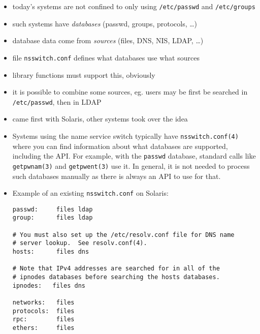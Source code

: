 \begin{slide}
\begin{itemize}
\item today's systems are not confined to only using
\texttt{/etc/passwd} and \texttt{/etc/groups}
\item such systems have \emph{databases} (passwd, groups, protocols, \dots)
\item database data come from \emph{sources} (files, DNS, NIS, LDAP, \dots)
\item file \texttt{nsswitch.conf} defines what databases use what sources
\item library functions must support this, obviously
\item it is possible to combine some sources, eg. users may be first be searched
in \texttt{/etc/passwd}, then in LDAP
\item came first with Solaris, other systems took over the idea
\end{itemize}
\end{slide}

\label{name_service_switch}

\begin{itemize}
\item Systems using the name service switch typically have
\texttt{nsswitch.conf(4)} where you can find information about what databases
are supported, including the API.  For example, with the \texttt{passwd}
database, standard calls like \texttt{getpwnam(3)} and \texttt{getpwent(3)} use
it.  In general, it is not needed to process such databases manually as there is
always an API to use for that.
\item Example of an existing \texttt{nsswitch.conf} on Solaris:

\begin{verbatim}
passwd:     files ldap
group:      files ldap

# You must also set up the /etc/resolv.conf file for DNS name
# server lookup.  See resolv.conf(4).
hosts:      files dns

# Note that IPv4 addresses are searched for in all of the
# ipnodes databases before searching the hosts databases.
ipnodes:   files dns

networks:   files
protocols:  files
rpc:        files
ethers:     files
\end{verbatim}
\end{itemize}



